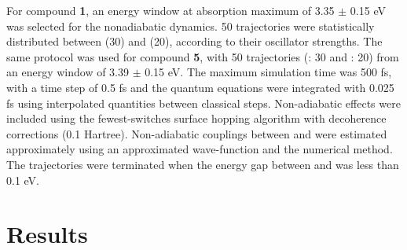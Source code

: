 For compound \textbf{1}, an energy window at absorption maximum of 3.35 $\pm$ 0.15 eV was selected for the nonadiabatic dynamics. 50 trajectories were statistically distributed between \sone{} (30) and \stwo{} (20), according to their oscillator strengths. The same protocol was used for compound \textbf{5}, with 50 trajectories (\sone: 30 and \stwo: 20) from an energy window of 3.39 $\pm$ 0.15 eV. The maximum simulation time was 500 fs, with a time step of 0.5 fs and the quantum equations were integrated with 0.025 fs using interpolated quantities between classical steps. Non-adiabatic effects were included using the fewest-switches surface hopping algorithm with decoherence corrections (0.1 Hartree). Non-adiabatic couplings between \stwo{} and \sone{} were estimated approximately using an approximated wave-function and the numerical method.\cite{Ryabinkin2015} The trajectories were terminated when the energy gap between \sone{} and \szero{} was less than 0.1 eV.

\section{Results}\label{section: NRdecay_Results}

